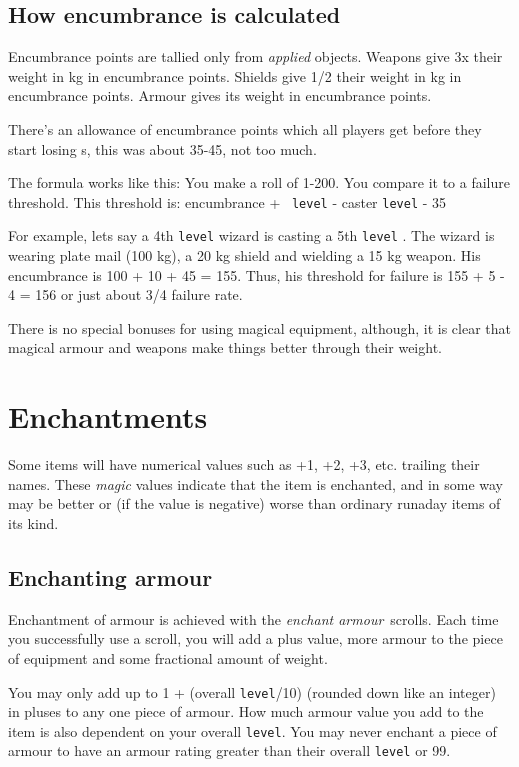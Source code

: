 \subsection{How encumbrance is calculated}
Encumbrance points are tallied only from {\em applied} objects. Weapons
give
3x their weight in kg in encumbrance points. Shields give 1/2 their weight
in kg in encumbrance points. Armour gives its weight in encumbrance points.

There's an allowance of encumbrance points which all players get before they
start losing \incantation s, this was about 35-45, not too much.

The formula works like this: You make a roll of 1-200. You compare it to a
failure threshold. This threshold is: encumbrance + \incantation\ {\tt level}
 - caster {\tt level} - 35

For example, lets say a 4th {\tt level} wizard is casting a 5th {\tt level}
\incantation . The wizard is wearing plate mail (100 kg), a 20 kg shield and
wielding a 15 kg weapon. His encumbrance is 100 + 10 + 45 = 155. Thus, his
threshold for failure is 155 + 5 - 4 = 156 or just about 3/4 failure rate.

There is no special bonuses for using magical equipment, although, it is
clear that magical armour and weapons make things better through their weight.

\section{Enchantments}\label{sec:enchant}

Some items will have numerical values such as +1, +2, +3, etc.
trailing their names. These {\em magic} values indicate that the item
is enchanted,
and in some way may be better or (if the value is negative) worse
than ordinary runaday items of its kind.

\subsection{Enchanting armour}

Enchantment of armour is achieved with the
{\em enchant armour}\ scrolls.
Each time you successfully use a scroll, you will
add a plus value, more armour to the piece of equipment and
some fractional amount of weight.

You may only add up to 1 + (overall {\tt level}/10) (rounded down like an
integer) in pluses to any one piece of armour. How much
armour value you add to the item is also dependent on your
overall {\tt level}. You may never enchant a piece of armour to
have an armour rating greater than their overall {\tt level} or 99.

